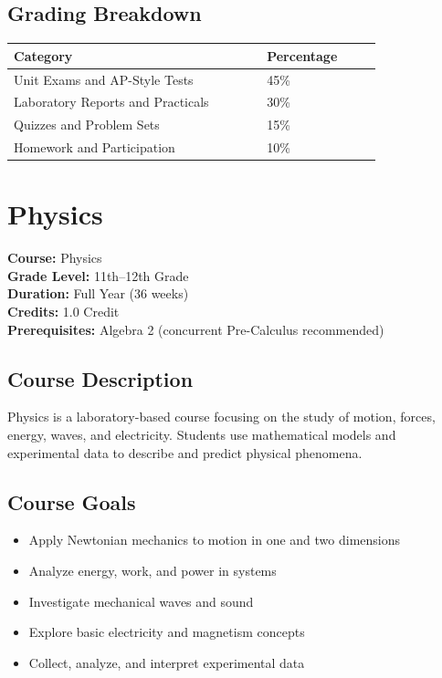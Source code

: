 \documentclass[12pt,oneside]{book}
\begin{document}
\section{Grading Breakdown}
\begin{center}
\begin{tabular}{L{0.55\linewidth}L{0.25\linewidth}}
\toprule
\textbf{Category} & \textbf{Percentage} \\
\midrule
Unit Exams and AP-Style Tests & 45\% \\
Laboratory Reports and Practicals & 30\% \\
Quizzes and Problem Sets & 15\% \\
Homework and Participation & 10\% \\
\bottomrule
\end{tabular}
\end{center}

\chapter{Physics}

\noindent\textbf{Course:} Physics\\
\textbf{Grade Level:} 11th--12th Grade\\
\textbf{Duration:} Full Year (36 weeks)\\
\textbf{Credits:} 1.0 Credit\\
\textbf{Prerequisites:} Algebra 2 (concurrent Pre-Calculus recommended)

\section{Course Description}
Physics is a laboratory-based course focusing on the study of motion, forces, energy, waves, and
electricity. Students use mathematical models and experimental data to describe and predict
physical phenomena.

\section{Course Goals}
\begin{itemize}[leftmargin=2em]
    \item Apply Newtonian mechanics to motion in one and two dimensions
    \item Analyze energy, work, and power in systems
    \item Investigate mechanical waves and sound
    \item Explore basic electricity and magnetism concepts
    \item Collect, analyze, and interpret experimental data
\end{itemize}
\end{document}
